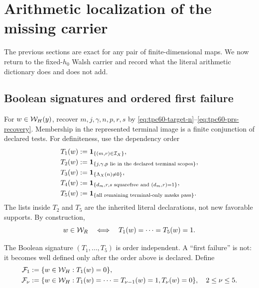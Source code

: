 \section{Arithmetic localization of the missing carrier}
\label{sec:tpc60-missing-partition}

The previous sections are exact for any pair of finite-dimensional maps.
We now return to the fixed-\(h_0\) Walsh carrier and record what the literal
arithmetic dictionary does and does not add.

\subsection{Boolean signatures and ordered first failure}

For \(w\in\mathcal W_H(y)\), recover \(m,j,\gamma,n,p,r,s\) by
\eqref{eq:tpc60-target-n}--\eqref{eq:tpc60-prs-recovery}.  Membership in
the represented terminal image is a finite conjunction of declared tests.
For definiteness, use the dependency order
\begin{align}
 T_1(w)&:=\mathbf 1_{\{(m,r)\in\mathcal I_X\}},
 \label{eq:tpc60-test-retained-pair}\\
 T_2(w)&:=\mathbf 1_{\{j,\gamma,p\text{ lie in the declared terminal scopes}\}},
 \label{eq:tpc60-test-terminal-scopes}\\
 T_3(w)&:=\mathbf 1_{\{\Lambda_X(n)\ne0\}},
 \label{eq:tpc60-test-terminal-weight}\\
 T_4(w)&:=\mathbf 1_{\{d_m,r,s\text{ squarefree and }(d_m,r)=1\}},
 \label{eq:tpc60-test-squarefree}\\
 T_5(w)&:=\mathbf 1_{\{\text{all remaining terminal-only masks pass}\}}.
 \label{eq:tpc60-test-remaining-masks}
\end{align}
The lists inside \(T_2\) and \(T_5\) are the inherited literal declarations,
not new favorable supports.  By construction,
\begin{equation}
 w\in\mathcal W_R
 \quad\Longleftrightarrow\quad
 T_1(w)=\cdots=T_5(w)=1.
 \label{eq:tpc60-represented-all-tests}
\end{equation}

The Boolean signature \((T_1,\ldots,T_5)\) is order independent.  A
``first failure'' is not: it becomes well defined only after the order
above is declared.  Define
\begin{align}
 \mathcal F_1&:=\{w\in\mathcal W_H:T_1(w)=0\},
 \label{eq:tpc60-first-failure-1}\\
 \mathcal F_\nu&:=\{w\in\mathcal W_H:
 T_1(w)=\cdots=T_{\nu-1}(w)=1, T_\nu(w)=0\},
 \quad2\le\nu\le5.
 \label{eq:tpc60-first-failure-nu}
\end{align}

